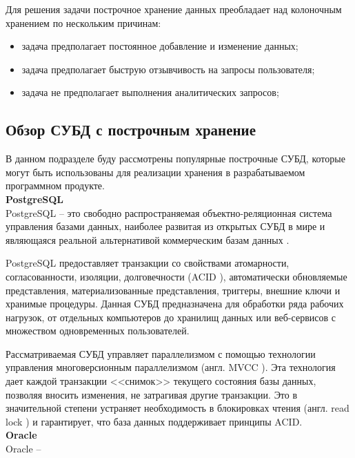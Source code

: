 Для решения задачи построчное хранение данных преобладает над колоночным хранением по нескольким причинам:

\begin{itemize}
	\item задача предполагает постоянное добавление и изменение данных;
	\item задача предполагает быструю отзывчивость на запросы пользователя;
	\item задача не предполагает выполнения аналитических запросов;
\end{itemize}

\subsection{Обзор СУБД с построчным хранение}

В данном подразделе буду рассмотрены популярные построчные СУБД, которые могут быть использованы для реализации хранения в разрабатываемом программном продукте.\\

\textbf{PostgreSQL}\\

PostgreSQL \cite{postgresql} -- это свободно распространяемая объектно-реляционная система управления базами данных, наиболее развитая из открытых СУБД в мире и являющаяся реальной альтернативой коммерческим базам данных \cite{postgresql-fact}.

PostgreSQL предоставляет транзакции со свойствами атомарности, согласованности, изоляции, долговечности (ACID \cite{acid}), автоматически обновляемые представления, материализованные представления, триггеры, внешние ключи и хранимые процедуры. Данная СУБД предназначена для обработки ряда рабочих нагрузок, от отдельных компьютеров до хранилищ данных или веб-сервисов с множеством одновременных пользователей. 

Рассматриваемая СУБД управляет параллелизмом с помощью технологии управления многоверсионным параллелизмом (англ. MVCC \cite{mvcc}). Эта технология дает каждой транзакции <<снимок>> текущего состояния базы данных, позволяя вносить изменения, не затрагивая другие транзакции. Это в значительной степени устраняет необходимость в блокировках чтения (англ. read lock \cite{r-lock}) и гарантирует, что база данных поддерживает принципы ACID. \\

\textbf{Oracle}\\

Oracle \cite{oracle} -- 

